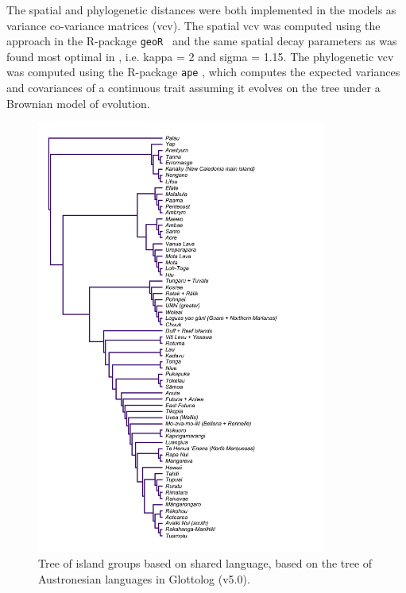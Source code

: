 \documentclass[unnumsec,webpdf,modern,medium]{oup-authoring-template}
\begin{document}
The spatial and phylogenetic distances were both implemented in the models as variance co-variance matrices (vcv). The spatial vcv was computed using the approach in the R-package \texttt{geoR }\citep{ribeiro2020package} and the same spatial decay parameters as was found most optimal in \citet{grambank_release}, i.e. kappa = 2 and sigma = 1.15. The phylogenetic vcv was computed using the R-package \texttt{ape} \citet{R-ape}, which computes the expected variances and covariances of a continuous trait assuming it evolves on the tree under a Brownian model of evolution.

\begin{figure}[ht]
\includegraphics[width=0.85\textwidth]{island_group_tree_medium.png}
\caption{Tree of island groups based on shared language, based on the tree of Austronesian languages in Glottolog (v5.0).}
\label{island_group_tree_medium}
\end{figure}
\end{document}
